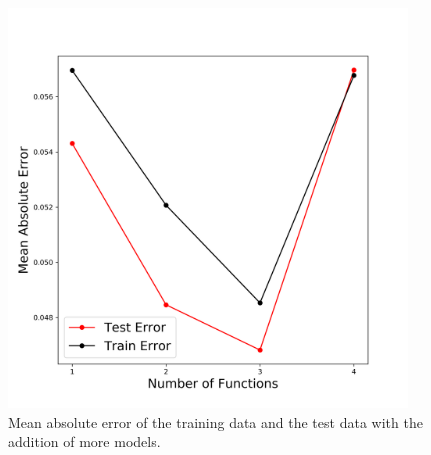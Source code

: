 \begin{figure}[h!]
\centering
\includegraphics[width=\textwidth,height=300pt,keepaspectratio]{models_performance.png}

\caption{Mean absolute error of the training data and the test data with the
addition of more models.}
\label{fig:models_performance}
\end{figure}

